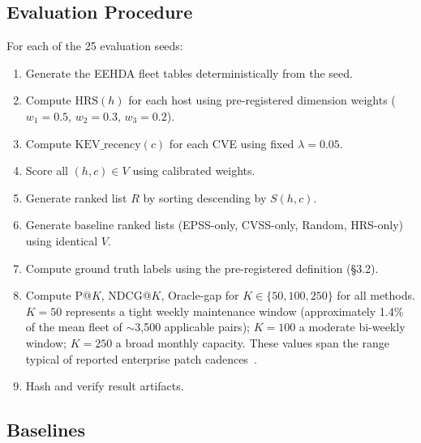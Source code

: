 \subsection{Evaluation Procedure}

For each of the 25 evaluation seeds:

\begin{enumerate}
 \item Generate the EEHDA fleet tables deterministically from the seed.
 \item Compute $\mathrm{HRS}(h)$ for each host using pre-registered dimension weights ($w_1=0.5$, $w_2=0.3$, $w_3=0.2$).
 \item Compute $\mathrm{KEV\_recency}(c)$ for each CVE using fixed $\lambda = 0.05$.
 \item Score all $(h, c) \in V$ using calibrated weights.
 \item Generate ranked list $R$ by sorting descending by $S(h, c)$.
 \item Generate baseline ranked lists (EPSS-only, CVSS-only, Random, HRS-only) using identical $V$.
 \item Compute ground truth labels using the pre-registered definition (\S3.2).
 \item Compute P@$K$, NDCG@$K$, Oracle-gap for $K \in \{50, 100, 250\}$ for all methods. $K = 50$ represents a tight weekly maintenance window (approximately 1.4\% of the mean fleet of $\sim$3,500 applicable pairs); $K = 100$ a moderate bi-weekly window; $K = 250$ a broad monthly capacity. These values span the range typical of reported enterprise patch cadences~\cite{verizon2026dbir}.
 \item Hash and verify result artifacts.
\end{enumerate}

\subsection{Baselines}

